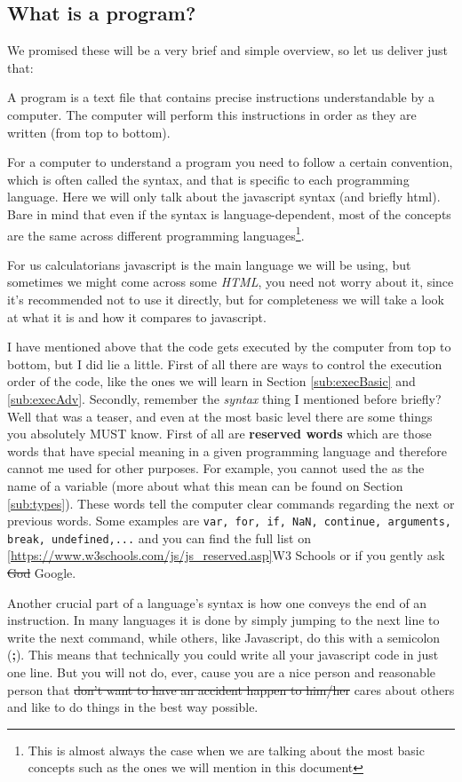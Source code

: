 \subsection{What is a program?} 
\label{sub:program}
We promised these will be a very brief and simple overview, so let us deliver just that:

A program is a text file that contains precise instructions understandable by a computer. The computer will perform this instructions in order as they are written (from top to bottom). 

For a computer to understand a program you need to follow a certain convention, which is often called the syntax, and that is specific to each programming language. Here we will only talk about the javascript syntax (and briefly html). Bare in mind that even if the syntax is language-dependent, most of the concepts are the same across different programming languages\footnote{This is almost always the case when we are talking about the most basic concepts such as the ones we will mention in this document}.

For us calculatorians javascript is the main language we will be using, but sometimes we might come across some \textit{HTML}, you need not worry about it, since it's recommended not to use it directly, but for completeness we will take a look at what it is and how it compares to javascript.

I have mentioned above that the code gets executed by the computer from top to bottom, but I did lie a little. First of all there are ways to control the execution order of the code, like the ones we will learn in Section \ref{sub:execBasic} and \ref{sub:execAdv}. Secondly, remember the \textit{syntax} thing I mentioned before briefly? Well that was a teaser, and even at the most basic level there are some things you absolutely MUST know. First of all are \textbf{reserved words} which are those words that have special meaning in a given programming language and therefore cannot me used for other purposes. For example, you cannot used the as the name of a variable (more about what this mean can be found on Section \ref{sub:types}). These words tell the computer clear commands regarding the next or previous words. Some examples are \texttt{var, for, if, NaN, continue, arguments, break, undefined,...} and you can find the full list on \ref{https://www.w3schools.com/js/js_reserved.asp}{W3 Schools} or if you gently ask \sout{God} Google.

Another crucial part of a language's syntax is how one conveys the end of an instruction. In many languages it is done by simply jumping to the next line to write the next command, while others, like Javascript, do this with a semicolon (\textbf{;}). This means that technically you could write all your javascript code in just one line. But you will not do, ever, cause you are a nice person and reasonable person that \sout{don't want to have an accident happen to him/her} cares about others and like to do things in the best way possible.

